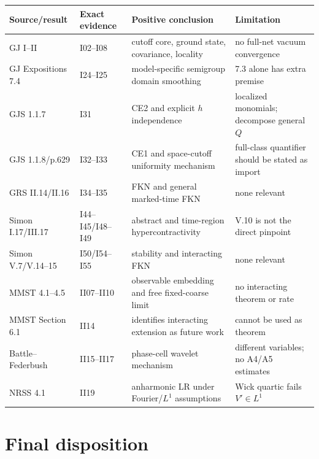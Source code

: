 \documentclass[11pt,a4paper]{article}
\begin{document}
\begin{longtable}{P{3.0cm}P{3.0cm}P{4.0cm}P{4.0cm}}
\toprule
Source/result & Exact evidence & Positive conclusion & Limitation\\
\midrule\endhead
GJ I--II & I02--I08 & cutoff core, ground state, covariance, locality & no full-net
vacuum convergence\\
GJ Expositions 7.4 & I24--I25 & model-specific semigroup domain smoothing & 7.3 alone
has extra premise\\
GJS 1.1.7 & I31 & CE2 and explicit $h$ independence & localized monomials; decompose
general $Q$\\
GJS 1.1.8/p.629 & I32--I33 & CE1 and space-cutoff uniformity mechanism & full-class
quantifier should be stated as import\\
GRS II.14/II.16 & I34--I35 & FKN and general marked-time FKN & none relevant\\
Simon I.17/III.17 & I44--I45/I48--I49 & abstract and time-region hypercontractivity &
V.10 is not the direct pinpoint\\
Simon V.7/V.14--15 & I50/I54--I55 & stability and interacting FKN & none relevant\\
MMST 4.1--4.5 & II07--II10 & observable embedding and free fixed-coarse limit & no
interacting theorem or rate\\
MMST Section 6.1 & II14 & identifies interacting extension as future work & cannot be
used as theorem\\
Battle--Federbush & II15--II17 & phase-cell wavelet mechanism & different variables;
no A4/A5 estimates\\
NRSS 4.1 & II19 & anharmonic LR under Fourier/$L^1$ assumptions & Wick quartic fails
$V'\in L^1$\\
\bottomrule
\end{longtable}

\section{Final disposition}
\end{document}
